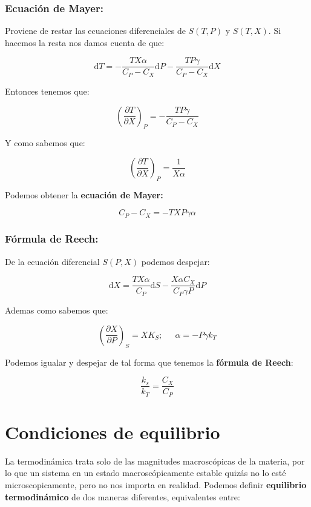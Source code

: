 \documentclass[12pt,a4paper]{article}
\newcommand{\D}{\mathrm{d}}
\newcommand{\parentesis}[1]{\left( #1 \right)}
\newcommand{\parciales}[2]{\frac{\partial #1}{\partial #2}}
\begin{document}
\subsubsection{Ecuación de Mayer:}

Proviene de restar las ecuaciones diferenciales de $S(T, P)$ y $S(T,X)$. Si hacemos la resta nos damos cuenta de que:

$$ \D T = - \dfrac{T X \alpha}{C_P - C_X} \D P - \dfrac{T P \gamma}{C_P - C_X} \D X  $$

Entonces tenemos que: 

$$  \parentesis{\parciales{T}{X}}_{P} = - \dfrac{T P \gamma}{C_P - C_X} $$

Y como sabemos que: 

$$  \parentesis{\parciales{T}{X}}_{P} = \dfrac{1}{X \alpha} $$

Podemos obtener la \textbf{ecuación de Mayer:}

\begin{equation}
C_P - C_X = - T X P \gamma \alpha
\end{equation}

\subsubsection{Fórmula de Reech:}

De la ecuación diferencial $S(P,X)$ podemos despejar: 

$$ \D X = \dfrac{T X \alpha}{C_P} \D S - \dfrac{X \alpha C_X}{C_P \gamma P} \D P  $$

Ademas como sabemos que: 

$$  \parentesis{\parciales{X}{P}}_{S} = X K_S; \quad \ \ \alpha = - P \gamma k_T $$

Podemos igualar y despejar de tal forma que tenemos la \textbf{fórmula de Reech}:

\begin{equation}
\dfrac{k_s}{k_T} = \dfrac{C_X}{C_P}
\end{equation}

\newpage

\section{Condiciones de equilibrio}

La termodinámica trata solo de las magnitudes macroscópicas de la materia, por lo que un sistema en un estado macroscópicamente estable quizás no lo esté microscopicamente, pero no nos importa en realidad. Podemos definir \textbf{equilibrio termodinámico} de dos maneras diferentes, equivalentes entre:
\end{document}
